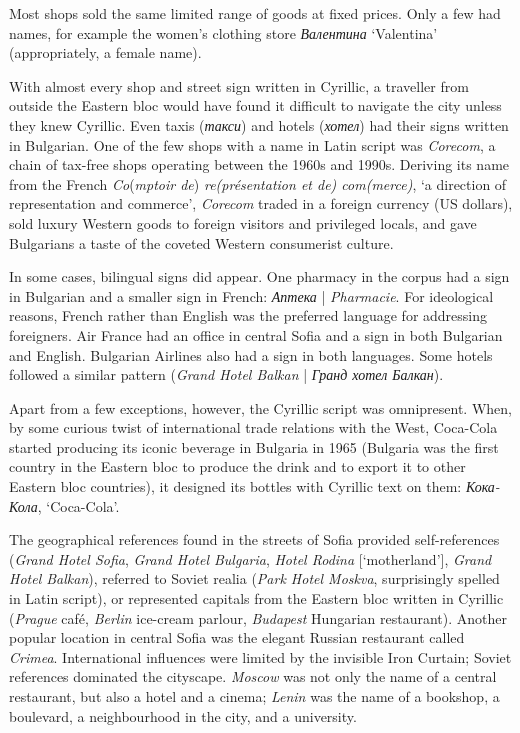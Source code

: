 \documentclass[output=paper]{langscibook}
\begin{document}
Most shops sold the same limited range of goods at fixed prices. Only a few had names, for example the women’s clothing store \textit{Валентина} ‘Valentina’ (appropriately, a female name). 

With almost every shop and street sign written in Cyrillic, a traveller from outside the Eastern bloc would have found it difficult to navigate the city unless they knew Cyrillic. Even taxis (\textit{такси}) and hotels (\textit{хотел}) had their signs written in Bulgarian. One of the few shops with a name in Latin script was \textit{Corecom}, a chain of tax-free shops operating between the 1960s and 1990s. Deriving its name from the French \textit{Co}(\textit{mptoir de}) \textit{re(présentation et de) com(merce)}, ‘a direction of representation and commerce’, \textit{Corecom} traded in a foreign currency (US dollars), sold luxury Western goods to foreign visitors and privileged locals, and gave Bulgarians a taste of the coveted Western consumerist culture.

In some cases, bilingual signs did appear. One pharmacy in the corpus had a sign in Bulgarian and a smaller sign in French: \textit{Аптека} | \textit{Pharmacie}. For ideological reasons, French rather than English was the preferred language for addressing foreigners. Air France had an office in central Sofia and a sign in both Bulgarian and English. Bulgarian Airlines also had a sign in both languages. Some hotels followed a similar pattern (\textit{Grand Hotel Balkan} | \textit{Гранд хотел Балкан}). 

Apart from a few exceptions, however, the Cyrillic script was omnipresent. When, by some curious twist of international trade relations with the West, Coca-Cola started producing its iconic beverage in Bulgaria in 1965 (Bulgaria was the first country in the Eastern bloc to produce the drink and to export it to other Eastern bloc countries), it designed its bottles with Cyrillic text on them: \textit{Кока-Кола}, ‘Coca-Cola’. 

The geographical references found in the streets of Sofia provided self-referen\-ces (\textit{Grand Hotel Sofia}, \textit{Grand Hotel Bulgaria}, \textit{Hotel Rodina} [‘motherland’], \textit{Grand Hotel Balkan}), referred to Soviet realia (\textit{Park Hotel Moskva}, surprisingly spelled in Latin script), or represented capitals from the Eastern bloc written in Cyrillic (\textit{Prague} café, \textit{Berlin} ice-cream parlour, \textit{Budapest} Hungarian restaurant). Another popular location in central Sofia was the elegant Russian restaurant called \textit{Crimea}. International influences were limited by the invisible Iron Curtain; Soviet references dominated the cityscape. \textit{Moscow} was not only the name of a central restaurant, but also a hotel and a cinema; \textit{Lenin} was the name of a bookshop, a boulevard, a neighbourhood in the city, and a university.
\end{document}
